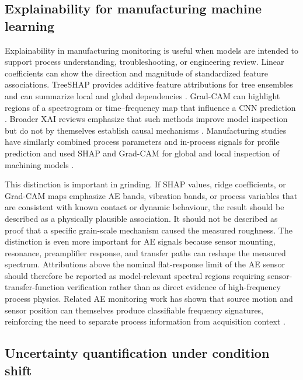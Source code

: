 \subsection{Explainability for manufacturing machine learning}\label{rw:explainability}

Explainability in manufacturing monitoring is useful when models are intended to support process understanding, troubleshooting, or engineering review. Linear coefficients can show the direction and magnitude of standardized feature associations. TreeSHAP provides additive feature attributions for tree ensembles and can summarize local and global dependencies \cite{Lundberg2020}. Grad-CAM can highlight regions of a spectrogram or time--frequency map that influence a CNN prediction \cite{selvaraju2017grad}. Broader XAI reviews emphasize that such methods improve model inspection but do not by themselves establish causal mechanisms \cite{Arrieta2020}. Manufacturing studies have similarly combined process parameters and in-process signals for profile prediction \cite{Wu2022ECMProfile} and used SHAP and Grad-CAM for global and local inspection of machining models \cite{Wu2025ECMInterpretability}.

This distinction is important in grinding. If SHAP values, ridge coefficients, or Grad-CAM maps emphasize AE bands, vibration bands, or process variables that are consistent with known contact or dynamic behaviour, the result should be described as a physically plausible association. It should not be described as proof that a specific grain-scale mechanism caused the measured roughness. The distinction is even more important for AE signals because sensor mounting, resonance, preamplifier response, and transfer paths can reshape the measured spectrum. Attributions above the nominal flat-response limit of the AE sensor should therefore be reported as model-relevant spectral regions requiring sensor-transfer-function verification rather than as direct evidence of high-frequency process physics. Related AE monitoring work has shown that source motion and sensor position can themselves produce classifiable frequency signatures, reinforcing the need to separate process information from acquisition context \cite{Wu2025LPBFAE}.

\subsection{Uncertainty quantification under condition shift}\label{rw:uq}

